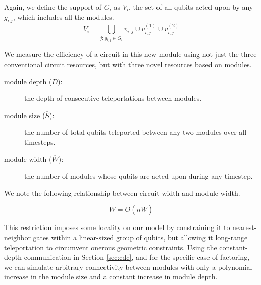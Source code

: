 \begin{definition}
\begin{itemize}
Again, we define the support of $G_i$
as $V_i$, the set of all qubits acted upon by any $g_{i.j}$, which
includes all the modules.
\begin{equation}
V_i = \bigcup_{j: g_{i,j} \in G_i} v_{i,j} \cup v^{(1)}_{i,j} \cup v^{(2)}_{i,j} 
\end{equation}

\end{itemize}
\end{definition}

We measure the efficiency of a circuit in this new module using not just
the three conventional circuit resources, but with three novel resources
based on modules.

\begin{description}

\item[module depth ($\overline{D}$):] the depth of consecutive teleportations between modules.
\item[module size ($\overline{S}$):] the number of total qubits teleported between any two modules over all timesteps.
\item[module width ($\overline{W}$):] the number of modules whose qubits are
acted upon during any timestep.

\end{description}



We note the following relationship between circuit width and
module width.

\begin{equation}
W = O(n\overline{W})
\label{eqn:module-width}
\end{equation}

This restriction imposes some locality on our model by constraining it to
nearest-neighbor gates within a linear-sized group of qubits, but allowing
it long-range teleportation to circumvent onerous geometric constraints.
Using the constant-depth communication in Section \ref{sec:cdc}, and for
the specific case of factoring, we
can simulate arbitrary connectivity between modules with only a polynomial
increase in the module size and a constant increase in module depth.
